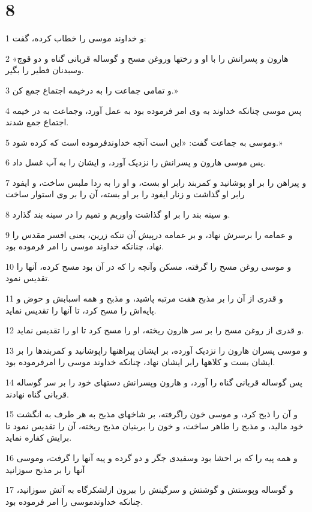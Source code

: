 \chapter{8}

\par 1 و خداوند موسی را خطاب کرده، گفت:
\par 2 «هارون و پسرانش را با او و رختها وروغن مسح و گوساله قربانی گناه و دو قوچ وسبدنان فطیر را بگیر.
\par 3 و تمامی جماعت را به درخیمه اجتماع جمع کن.»
\par 4 پس موسی چنانکه خداوند به وی امر فرموده بود به عمل آورد، وجماعت به در خیمه اجتماع جمع شدند.
\par 5 وموسی به جماعت گفت: «این است آنچه خداوندفرموده است که کرده شود.»
\par 6 پس موسی هارون و پسرانش را نزدیک آورد، و ایشان را به آب غسل داد.
\par 7 و پیراهن را بر او پوشانید و کمربند رابر او بست، و او را به ردا ملبس ساخت، و ایفود رابر او گذاشت و زنار ایفود را بر او بسته، آن را بر وی استوار ساخت
\par 8 و سینه بند را بر او گذاشت واوریم و تمیم را در سینه بند گذارد.
\par 9 و عمامه را برسرش نهاد، و بر عمامه در‌پیش آن تنکه زرین، یعنی افسر مقدس را نهاد، چنانکه خداوند موسی را امر فرموده بود.
\par 10 و موسی روغن مسح را گرفته، مسکن وآنچه را که در آن بود مسح کرده، آنها را تقدیس نمود.
\par 11 و قدری از آن را بر مذبح هفت مرتبه پاشید، و مذبح و همه اسبابش و حوض و پایه‌اش را مسح کرد، تا آنها را تقدیس نماید.
\par 12 و قدری از روغن مسح را بر سر هارون ریخته، او را مسح کرد تا او را تقدیس نماید.
\par 13 و موسی پسران هارون را نزدیک آورده، بر ایشان پیراهنها راپوشانید و کمربندها را بر ایشان بست و کلاهها رابر ایشان نهاد، چنانکه خداوند موسی را امرفرموده بود.
\par 14 پس گوساله قربانی گناه را آورد، و هارون وپسرانش دستهای خود را بر سر گوساله قربانی گناه نهادند.
\par 15 و آن را ذبح کرد، و موسی خون راگرفته، بر شاخهای مذبح به هر طرف به انگشت خود مالید، و مذبح را طاهر ساخت، و خون را بربنیان مذبح ریخته، آن را تقدیس نمود تا برایش کفاره نماید.
\par 16 و همه پیه را که بر احشا بود وسفیدی جگر و دو گرده و پیه آنها را گرفت، وموسی آنها را بر مذبح سوزانید
\par 17 و گوساله وپوستش و گوشتش و سرگینش را بیرون ازلشکرگاه به آتش سوزانید، چنانکه خداوندموسی را امر فرموده بود.
